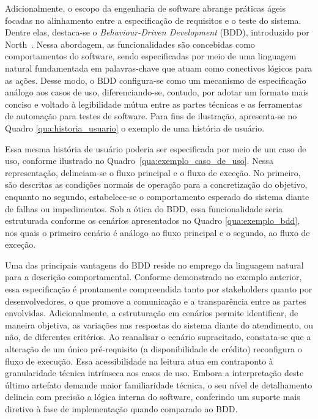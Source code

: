 Adicionalmente, o escopo da engenharia de software abrange práticas ágeis focadas no alinhamento entre a especificação de requisitos e o teste do sistema. Dentre elas, destaca-se o \textit{Behaviour-Driven Development} (BDD), introduzido por North~\cite{26}. Nessa abordagem, as funcionalidades são concebidas como comportamentos do software, sendo especificadas por meio de uma linguagem natural fundamentada em palavras-chave que atuam como conectivos lógicos para as ações. Desse modo, o BDD configura-se como um mecanismo de especificação análogo aos casos de uso, diferenciando-se, contudo, por adotar um formato mais conciso e voltado à legibilidade mútua entre as partes técnicas e as ferramentas de automação para testes de software. Para fins de ilustração, apresenta-se no Quadro \ref{qua:historia_usuario} o exemplo de uma história de usuário.

Essa mesma história de usuário poderia ser especificada por meio de um caso de uso, conforme ilustrado no Quadro~\ref{qua:exemplo_caso_de_uso}. Nessa representação, delineiam-se o fluxo principal e o fluxo de exceção. No primeiro, são descritas as condições normais de operação para a concretização do objetivo, enquanto no segundo, estabelece-se o comportamento esperado do sistema diante de falhas ou impedimentos. Sob a ótica do BDD, essa funcionalidade seria estruturada conforme os cenários apresentados no Quadro \ref{qua:exemplo_bdd}, nos quais o primeiro cenário é análogo ao fluxo principal e o segundo, ao fluxo de exceção.



Uma das principais vantagens do BDD reside no emprego da linguagem natural para a descrição comportamental. Conforme demonstrado no exemplo anterior, essa especificação é prontamente compreendida tanto por stakeholders quanto por desenvolvedores, o que promove a comunicação e a transparência entre as partes envolvidas. Adicionalmente, a estruturação em cenários permite identificar, de maneira objetiva, as variações nas respostas do sistema diante do atendimento, ou não, de diferentes critérios. Ao reanalisar o cenário supracitado, constata-se que a alteração de um único pré-requisito (a disponibilidade de crédito) reconfigura o fluxo de execução. Essa acessibilidade na leitura atua em contraponto à granularidade técnica intrínseca aos casos de uso. Embora a interpretação deste último artefato demande maior familiaridade técnica, o seu nível de detalhamento delineia com precisão a lógica interna do software, conferindo um suporte mais diretivo à fase de implementação quando comparado ao BDD.

